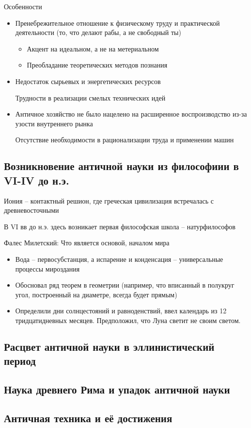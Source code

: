 \documentclass{book}
\theoremstyle{definition}
\begin{document}
    Особенности
    \begin{itemize}
        \item  Пренебрежительное отношение к физическому труду и практической деятельности (то, что делают рабы, а не свободный ты)
            \begin{itemize}
                \item Акцент на идеальном, а не на метериальном
                \item Преобладание теоретических методов познания
            \end{itemize}
        \item Недостаток сырьевых и энергетических ресурсов

            Трудности в реализации смелых технических идей
        \item Античное хозяйство не было нацелено на расширенное воспроизводство из-за узости внутреннего рынка

            Отсутствие необходимости в рационализации труда и применении машин
    \end{itemize}
    \subsection{Возникновение античной науки из философиии в VI-IV до н.э.}

    Иония -- контактный решион, где греческая цивилизация встречалась с древневосточными

    В VI вв до н.э. здесь возникает первая философская школа -- натурфилософов

    Фалес Милетский: Что является основой, началом мира
    \begin{itemize}
        \item  Вода -- первосубстанция, а испарение и конденсация -- универсальные процессы мироздания
        \item Обосновал ряд теорем в геометрии (например, что вписанный в полукруг угол, построенный на диаметре, всегда будет прямым)
        \item Определили дни солнцестояний и равноденствий, ввел календарь из 12 тридцатидневных месяцев. Предположил, что Луна светит не своим светом.
    \end{itemize}
    \subsection{Расцвет античной науки в эллинистический период}
    \subsection{Наука древнего Рима и упадок античной науки}
    \subsection{Античная техника и её достижения}
\end{document}
